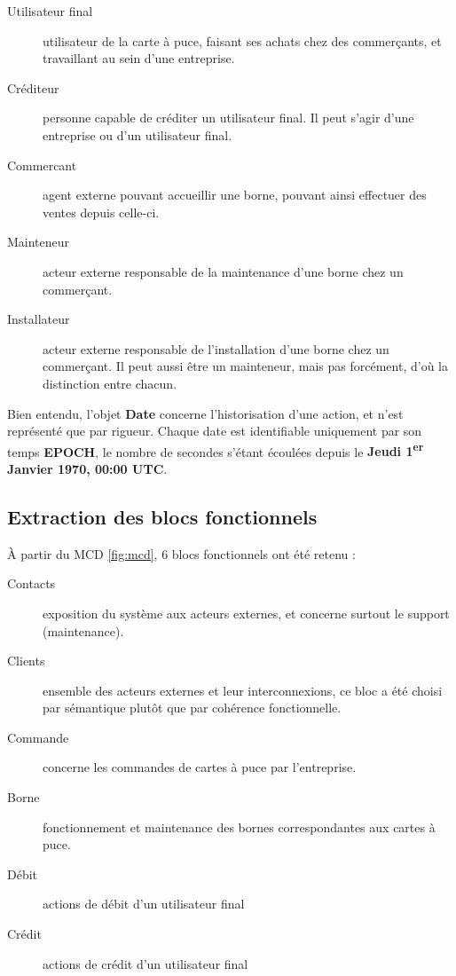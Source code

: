 \begin{description}
\begin{itemize}
    \end{itemize}
  \item[Utilisateur final] utilisateur de la carte à puce, faisant ses achats
    chez des commerçants, et travaillant au sein d'une entreprise.
  \item[Créditeur] personne capable de créditer un utilisateur final. Il peut
    s'agir d'une entreprise ou d'un utilisateur final.
  \item[Commercant] agent externe pouvant accueillir une borne, pouvant ainsi
    effectuer des ventes depuis celle-ci.
  \item[Mainteneur] acteur externe responsable de la maintenance d'une borne
    chez un commerçant.
  \item[Installateur] acteur externe responsable de l'installation d'une borne
    chez un commerçant. Il peut aussi être un mainteneur, mais pas forcément,
    d'où la distinction entre chacun.
\end{description}

Bien entendu, l'objet \textbf{Date} concerne l'historisation d'une action, et
n'est représenté que par rigueur. Chaque date est identifiable uniquement par
son temps \textbf{EPOCH}, le nombre de secondes s'étant écoulées depuis le
\textbf{Jeudi 1\textsuperscript{er} Janvier 1970, 00:00 UTC}.

\subsection{Extraction des blocs fonctionnels}

À partir du MCD \ref{fig:mcd}, 6 blocs fonctionnels ont été retenu :

\begin{description}
  \item[Contacts] exposition du système aux acteurs externes, et concerne
    surtout le support (maintenance).
  \item[Clients] ensemble des acteurs externes et leur interconnexions, ce bloc
    a été choisi par sémantique plutôt que par cohérence fonctionnelle.
  \item[Commande] concerne les commandes de cartes à puce par l'entreprise.
  \item[Borne] fonctionnement et maintenance des bornes correspondantes aux
    cartes à puce.
  \item[Débit] actions de débit d'un utilisateur final
  \item[Crédit] actions de crédit d'un utilisateur final
\end{description}

